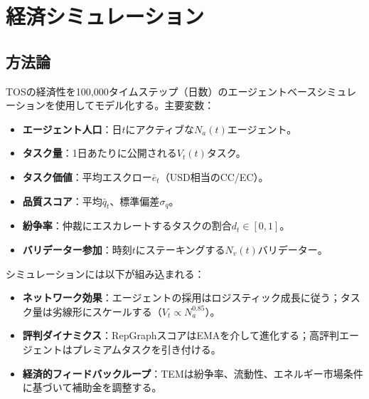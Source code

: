 \documentclass[11pt]{article}
\begin{document}
\section{経済シミュレーション}
\label{sec:econ-sim}

\subsection{方法論}
TOSの経済性を100,000タイムステップ（日数）のエージェントベースシミュレーションを使用してモデル化する。主要変数：
\begin{itemize}[noitemsep]
  \item \textbf{エージェント人口}：日$t$にアクティブな$N_a(t)$エージェント。
  \item \textbf{タスク量}：1日あたりに公開される$V_t(t)$タスク。
  \item \textbf{タスク価値}：平均エスクロー$\bar{e}_t$（USD相当のCC/EC）。
  \item \textbf{品質スコア}：平均$\bar{q}_t$、標準偏差$\sigma_q$。
  \item \textbf{紛争率}：仲裁にエスカレートするタスクの割合$d_t \in [0,1]$。
  \item \textbf{バリデーター参加}：時刻$t$にステーキングする$N_v(t)$バリデーター。
\end{itemize}
シミュレーションには以下が組み込まれる：
\begin{itemize}[noitemsep]
  \item \textbf{ネットワーク効果}：エージェントの採用はロジスティック成長に従う；タスク量は劣線形にスケールする（$V_t \propto N_a^{0.85}$）。
  \item \textbf{評判ダイナミクス}：RepGraphスコアはEMAを介して進化する；高評判エージェントはプレミアムタスクを引き付ける。
  \item \textbf{経済的フィードバックループ}：TEMは紛争率、流動性、エネルギー市場条件に基づいて補助金を調整する。
\end{itemize}
\end{document}
